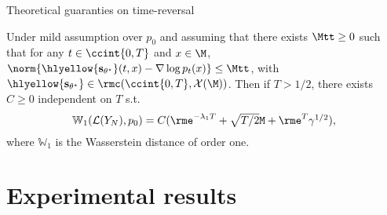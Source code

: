    
   
   \begin{frame}{Theoretical guaranties on time-reversal}
   
   \begin{theorem}{}{}
       \label{thm:weak_qualitative}
       Under mild assumption over $p_0$ and assuming that
       there exists $\Mtt \geq 0$ such that for any $t \in \ccint{0,T}$ and
       $x \in \M$, $\norm{\hlyellow{\mathbf{s}_{\theta^{\star}}}(t,x) - \nabla \log p_{t}(x)} \leq \Mtt$, 
       with $\hlyellow{\mathbf{s}_{\theta^\star}} \in \rmc(\ccint{0,T}, \mathcal{X}(\M))$.
       Then if $T > 1/2$, there exists $C \geq 0$ independent on $T$ s.t.\
       \begin{equation}
           \textstyle{
            \mathbb{W}_1(\mathcal{L}(Y_N), p_0) = C (  \rme^{-\lambda_1 T} + \sqrt{T/2}   \mathtt{M} + \rme^T \gamma^{1/2})  ,
           }
       \end{equation}
       where $\mathbb{W}_1$ is the Wasserstein distance of order one. %
   
   \end{theorem}
   
   \end{frame}
   
   
   \section{Experimental results}
   
